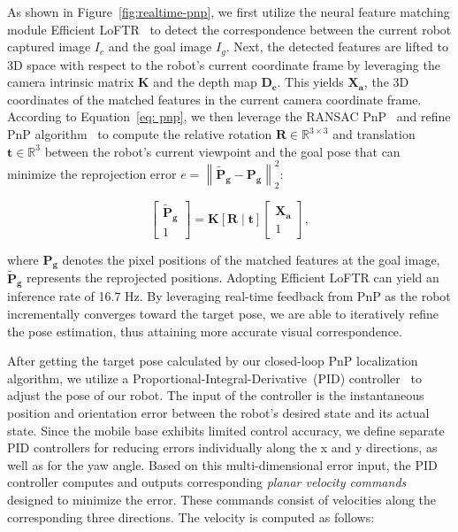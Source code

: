As shown in Figure~\ref{fig:realtime-pnp}, we first utilize the neural feature matching module Efficient LoFTR~\cite{wang2024efficient} to detect the correspondence between the current robot captured image $I_{c}$ and the goal image $I_{g}$. Next, the detected features are lifted to 3D space with respect to the robot's current coordinate frame by leveraging the camera intrinsic matrix $\mathbf{K}$ and the depth map $\mathbf{D_{c}}$. This yields $\mathbf{X_a}$, the 3D coordinates of the matched features in the current camera coordinate frame. According to Equation~\ref{eq: pnp}, we then leverage the RANSAC PnP~\cite{zuliani2009ransac} and refine PnP algorithm~\cite{madsen2004methods,eade2013gauss} to compute the relative rotation $\mathbf{R} \in \mathbb{R}^{3 \times 3}$ and translation $\mathbf{t} \in \mathbb{R}^{3}$ between the robot’s current viewpoint and the goal pose that can minimize the reprojection error $e=\left\|\tilde{\mathbf{P}}_{\mathbf{g}}-\mathbf{P}_{\mathbf{g}}\right\|_2^2 $: 

\begin{equation}
\label{eq: pnp}
\left[\begin{array}{c}
\tilde{\mathbf{P}}_{\mathbf{g}} \\
1
\end{array}\right]=\mathbf{K}[\mathbf{R} \mid \mathbf{t}]\left[\begin{array}{c}
\mathbf{X_a} \\
1
\end{array}\right] ,   
\end{equation}

where $\mathbf{P_{g}}$ denotes the pixel positions of the matched features at the goal image,  $\tilde{\mathbf{P}}_{\mathbf{g}}$ represents the reprojected positions. 
Adopting Efficient LoFTR can yield an inference rate of 16.7 Hz. By leveraging real-time feedback from PnP as the robot incrementally converges toward the target pose, we are able to iteratively refine the pose estimation, thus attaining more accurate visual correspondence. 

After getting the target pose calculated by our closed-loop PnP localization algorithm, we utilize a Proportional-Integral-Derivative~(PID) controller~\cite{willis1999proportional} to adjust the pose of our robot. The input of the controller is the instantaneous position and orientation error between the robot's desired state and its actual state. Since the mobile base exhibits limited control accuracy, we define separate PID controllers for reducing errors individually along the x and y directions, as well as for the yaw angle. Based on this multi-dimensional error input, the PID controller computes and outputs corresponding \textit{planar velocity commands} designed to minimize the error. These commands consist of velocities along the corresponding three directions. The velocity is computed as follows:

